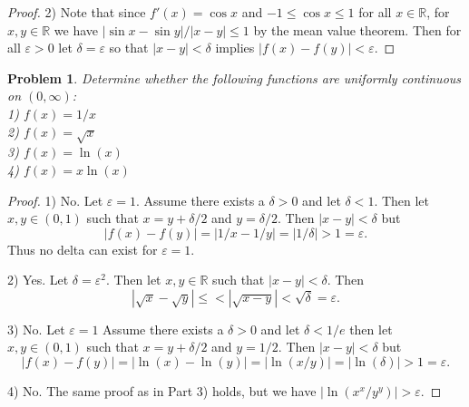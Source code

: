\documentclass{article}
\newtheorem{problem}{Problem}
\begin{document}
\begin{flushleft}
\begin{proof}
2) Note that since $f'(x) = \cos x$ and $-1 \leq \cos x \leq 1$ for all $x \in \mathbb{R}$, for $x,y \in \mathbb{R}$ we have $|\sin x - \sin y|/|x-y| \leq 1$ by the mean value theorem. Then for all $\varepsilon > 0$ let $\delta = \varepsilon$ so that $|x-y| < \delta$ implies $|f(x) - f(y)| < \varepsilon$.
\end{proof}

\begin{problem}
Determine whether the following functions are uniformly continuous on $(0, \infty)$:\\
1) $f(x) = 1/x$\\
2) $f(x) = \sqrt{x}$\\
3) $f(x) = \ln (x)$\\
4) $f(x) = x \ln (x)$
\end{problem}
\begin{proof}
1) No. Let $\varepsilon = 1$. Assume there exists a $\delta > 0$ and let $\delta < 1$. Then let $x, y \in (0,1)$ such that $x = y + \delta/2$ and $y = \delta/2$. Then $|x-y| < \delta$ but
\[
|f(x) - f(y)| = |1/x - 1/y| = |1/\delta| > 1 = \varepsilon.
\]
Thus no delta can exist for $\varepsilon = 1$.\newline

2) Yes. Let $\delta = \varepsilon^2$. Then let $x,y \in \mathbb{R}$ such that $|x-y| < \delta$. Then
\[
|\sqrt{x} - \sqrt{y}| \leq < |\sqrt{x-y}| < \sqrt{\delta} = \varepsilon.
\]\newline

3) No. Let $\varepsilon = 1$ Assume there exists a $\delta > 0$ and let $\delta < 1/e$ then let $x,y \in (0,1)$ such that $x = y + \delta/2$ and $y = 1/2$. Then $|x-y| < \delta$ but
\[
|f(x) - f(y)| = |\ln (x) - \ln (y)| = |\ln (x/y)| = |\ln (\delta)| > 1 = \varepsilon.
\]\newline

4) No. The same proof as in Part 3) holds, but we have $|\ln (x^x/y^y)| > \varepsilon$.
\end{proof}


\end{flushleft}
\end{document}
